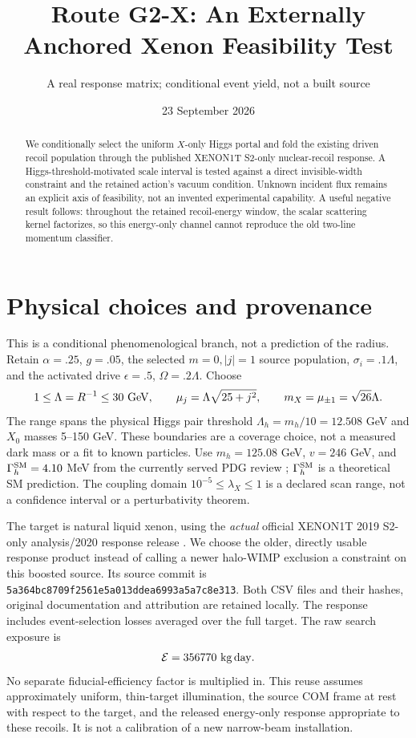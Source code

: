 \documentclass[11pt,a4paper]{article}
\title{Route G2-X: An Externally Anchored Xenon Feasibility Test}
\author{A real response matrix; conditional event yield, not a built source}
\date{23 September 2026}
\begin{document}
\maketitle
\begin{abstract}
We conditionally select the uniform $X$-only Higgs portal and fold the
existing driven recoil population through the published XENON1T S2-only
nuclear-recoil response. A Higgs-threshold-motivated scale interval is
tested against a direct invisible-width constraint and the retained
action's vacuum condition. Unknown incident flux remains an explicit
axis of feasibility, not an invented experimental capability. A useful
negative result follows: throughout the retained recoil-energy window,
the scalar scattering kernel factorizes, so this energy-only channel
cannot reproduce the old two-line momentum classifier.
\end{abstract}

\section{Physical choices and provenance}
This is a conditional phenomenological branch, not a prediction of the
radius. Retain $\alpha=.25$, $g=.05$, the selected $m=0,|j|=1$ source
population, $\sigma_i=.1\Lambda$, and the activated drive
$\epsilon=.5$, $\Omega=.2\Lambda$. Choose
\begin{equation}
 1\leq\Lambda=R^{-1}\leq30\ {\rm GeV},\qquad
 \mu_j=\Lambda\sqrt{25+j^2},\qquad m_X=\mu_{\pm1}=\sqrt{26}\Lambda.
\end{equation}
The range spans the physical Higgs pair threshold
$\Lambda_h=m_h/10=12.508$ GeV and $X_0$ masses 5--150 GeV.
These boundaries are a coverage choice, not a measured dark mass or a
fit to known particles. Use $m_h=125.08$ GeV, $v=246$ GeV, and
$\Gamma_h^{\rm SM}=4.10$ MeV from the currently served PDG review
\cite{pdg}; $\Gamma_h^{\rm SM}$ is a theoretical SM prediction.
The coupling domain $10^{-5}\leq\lambda_X\leq1$ is a declared scan
range, not a confidence interval or a perturbativity theorem.

The target is natural liquid xenon, using the \emph{actual} official
XENON1T 2019 S2-only analysis/2020 response release \cite{xenon,release}.
We choose the older, directly usable response product instead of calling
a newer halo-WIMP exclusion a constraint on this boosted source.
Its source commit is
\texttt{5a364bc8709f2561e5a013ddea6993a5a7c8e313}.
Both CSV files and their hashes, original documentation and attribution
are retained locally. The response includes event-selection losses
averaged over the full target. The raw search exposure is
\begin{equation}
 {\cal E}=356770\ {\rm kg\,day}.
\end{equation}
No separate fiducial-efficiency factor is multiplied in. This reuse
assumes approximately uniform, thin-target illumination, the source
COM frame at rest with respect to the target, and the released
energy-only response appropriate to these recoils. It is not a
calibration of a new narrow-beam installation.
\end{document}
